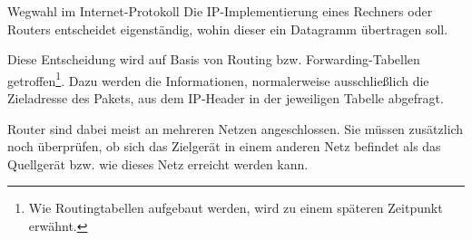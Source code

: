 \begin{defi}{Wegwahl im Internet-Protokoll}
    Die IP-Implementierung eines Rechners oder Routers entscheidet eigenständig, wohin dieser ein Datagramm übertragen soll.

    Diese Entscheidung wird auf Basis von Routing bzw. Forwarding-Tabellen getroffen\footnote{Wie Routingtabellen aufgebaut werden, wird zu einem späteren Zeitpunkt erwähnt.}.
    Dazu werden die Informationen, normalerweise ausschließlich die Zieladresse des Pakets, aus dem IP-Header in der jeweiligen Tabelle abgefragt.

    Router sind dabei meist an mehreren Netzen angeschlossen.
    Sie müssen zusätzlich noch überprüfen, ob sich das Zielgerät in einem anderen Netz befindet als das Quellgerät bzw. wie dieses Netz erreicht werden kann.
\end{defi}

